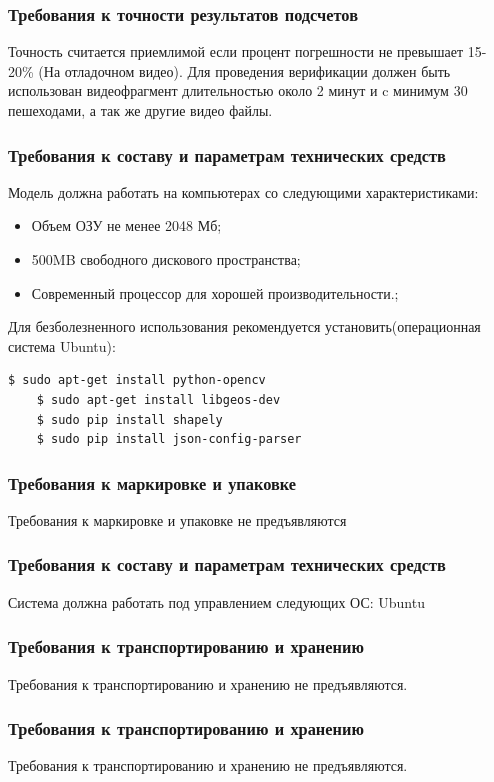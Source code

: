 \documentclass[12pt]{article}
\begin{document}
		\subsubsection{Требования к точности результатов подсчетов}
Точность считается приемлимой если процент погрешности не превышает 15-20\% (На отладочном видео). Для проведения верификации должен быть использован видеофрагмент длительностью около 2 минут и c минимум 30 пешеходами, а так же другие видео файлы. 
		\subsubsection{Требования к составу и параметрам технических средств}
Модель должна работать на компьютерах со следующими характеристиками:

\begin{itemize}
	\item Объем ОЗУ не менее 2048 Мб;
	\item 500MB свободного дискового пространства;
	\item Современный процессор для хорошей производительности.;

\end{itemize}

\noindent Для безболезненного использования рекомендуется установить(операционная система Ubuntu):
\begin{lstlisting}[language=bash]
	$ sudo apt-get install python-opencv
	$ sudo apt-get install libgeos-dev
	$ sudo pip install shapely
	$ sudo pip install json-config-parser
\end{lstlisting}
		\subsubsection{Требования к маркировке и упаковке }
Требования к маркировке и упаковке не предъявляются
		\subsubsection{Требования к составу и параметрам технических средств}

Система должна работать под управлением следующих ОС: Ubuntu

		\subsubsection{Требования к транспортированию и хранению }
Требования к транспортированию и хранению не предъявляются.
		\subsubsection{Требования к транспортированию и хранению}
		Требования к транспортированию и хранению не предъявляются.
\end{document}
